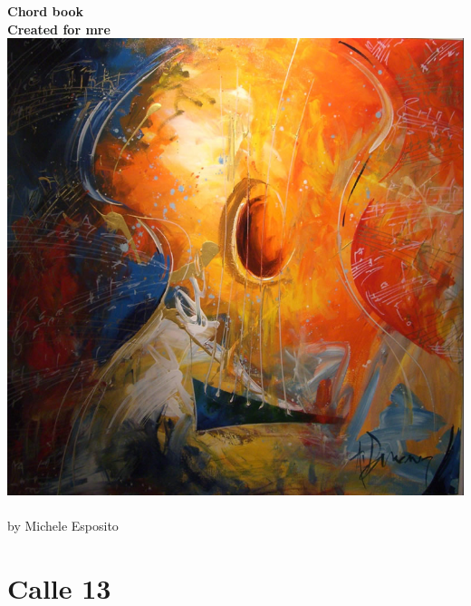 \documentclass[a4paper]{article}
\begin{document}
\begin{center}
\vspace{3cm}
{\bf{\huge Chord book }}\\
\vspace{2cm}
{\bf Created for mre}\\\vspace{2cm}
\includegraphics[scale=.6]{guitar2.png}\\
\vspace{1cm}
\\
by Michele Esposito \\
\end{center}

\newpage
\tableofcontents
\newpage

\section{Calle 13}
\end{document}

